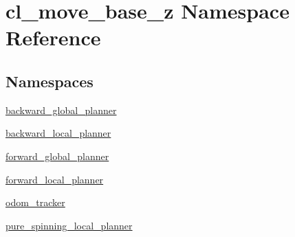 \hypertarget{namespacecl__move__base__z}{}\section{cl\+\_\+move\+\_\+base\+\_\+z Namespace Reference}
\label{namespacecl__move__base__z}
\subsection*{Namespaces}
\begin{DoxyCompactItemize}
\item 
 \hyperlink{namespacecl__move__base__z_1_1backward__global__planner}{backward\+\_\+global\+\_\+planner}
\item 
 \hyperlink{namespacecl__move__base__z_1_1backward__local__planner}{backward\+\_\+local\+\_\+planner}
\item 
 \hyperlink{namespacecl__move__base__z_1_1forward__global__planner}{forward\+\_\+global\+\_\+planner}
\item 
 \hyperlink{namespacecl__move__base__z_1_1forward__local__planner}{forward\+\_\+local\+\_\+planner}
\item 
 \hyperlink{namespacecl__move__base__z_1_1odom__tracker}{odom\+\_\+tracker}
\item 
 \hyperlink{namespacecl__move__base__z_1_1pure__spinning__local__planner}{pure\+\_\+spinning\+\_\+local\+\_\+planner}
\end{DoxyCompactItemize}
